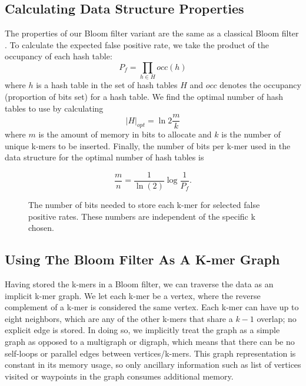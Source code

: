 \documentclass[12pt]{article} \usepackage{simplemargins}
\begin{document}
\subsection{Calculating Data Structure Properties}
The properties of our Bloom filter variant are the
same as a classical Bloom filter \cite{bloomsurvey}.
To calculate the expected false positive 
rate, we
take the product of the occupancy of each hash table:
\begin{displaymath}
P_f = \prod_{h \in H} occ(h)
\end{displaymath}
where $h$ is a hash table in the set of hash tables $H$ and $occ$ denotes
the occupancy (proportion of bits set) for a hash table.
We find the optimal number of hash tables
to use by calculating
\begin{displaymath}
\vert H \vert_{opt} = \ln 2 \frac{m}{k}
\end{displaymath}
where $m$ is the amount of memory in bits to allocate and $k$
is the number of unique k-mers to be inserted. Finally,
the number of bits per
k-mer used in the data structure for the optimal number of hash 
tables is

\begin{displaymath}
\frac{m}{n} = \frac{1}{\ln(2)} \log{\frac{1}{P_f}}.
\end{displaymath}

\begin{figure}
\caption{The number of bits needed to store each k-mer for selected
false positive rates.  These numbers are independent of the specific k
chosen.}
\end{figure}

\subsection{Using The Bloom Filter As A K-mer Graph}
Having stored the k-mers in a Bloom filter, we can traverse
the data as an implicit k-mer graph. We let each k-mer be a vertex, where
the reverse complement of a k-mer is considered the same
vertex. Each k-mer can
have up to eight neighbors, which are any of the other k-mers that
 share a $k-1$
overlap; no explicit edge is stored. In doing so, we implicitly 
treat the graph as a simple graph as opposed to a multigraph or 
digraph, which means that there can be no self-loops or parallel 
edges between vertices/k-mers. This graph representation is constant 
in its memory usage, so only ancillary information such as list 
of vertices visited or waypoints in the graph consumes additional 
memory.
\end{document}
